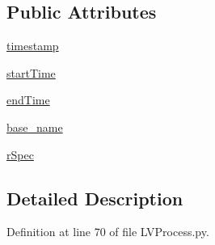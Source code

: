 \subsection*{Public Attributes}
\begin{DoxyCompactItemize}
\item 
\hyperlink{classrepo_1_1programs_1_1pythonpackages_1_1pr_1_1LVProcess_1_1SPDataSet_a3c864d29b91697c2cae59842b415b650}{timestamp}
\item 
\hyperlink{classrepo_1_1programs_1_1pythonpackages_1_1pr_1_1LVProcess_1_1SPDataSet_a65474bf477daedece959d538583a79ad}{start\-Time}
\item 
\hyperlink{classrepo_1_1programs_1_1pythonpackages_1_1pr_1_1LVProcess_1_1SPDataSet_a11a441b8209ec06564cab928f60c1317}{end\-Time}
\item 
\hyperlink{classrepo_1_1programs_1_1pythonpackages_1_1pr_1_1LVProcess_1_1SPDataSet_a293809e5300e77a5577b38cb972a6858}{base\-\_\-name}
\item 
\hyperlink{classrepo_1_1programs_1_1pythonpackages_1_1pr_1_1LVProcess_1_1SPDataSet_acb1b2d2e60f58df4a251622f3774be19}{r\-Spec}
\end{DoxyCompactItemize}


\subsection{Detailed Description}


Definition at line 70 of file L\-V\-Process.\-py.



